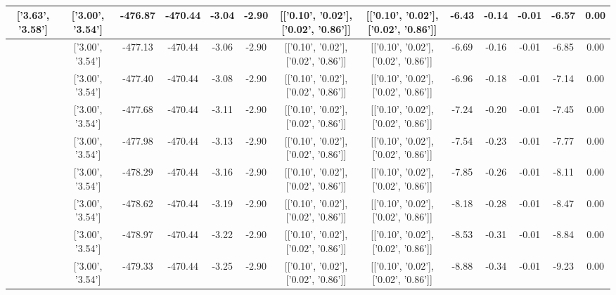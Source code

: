 \begin{table}[htbp]
\begin{adjustbox}{angle=90}
\begin{tabular}{|c|c|c|c|c|c|c|c|c|c|c|c|c|}
 ['3.63', '3.58'] & ['3.00', '3.54'] & -476.87 & -470.44 & -3.04 & -2.90 & [['0.10', '0.02'], ['0.02', '0.86']] & [['0.10', '0.02'], ['0.02', '0.86']] & -6.43 & -0.14 & -0.01 & -6.57 & 0.00\\ \hline
 ['3.67', '3.58'] & ['3.00', '3.54'] & -477.13 & -470.44 & -3.06 & -2.90 & [['0.10', '0.02'], ['0.02', '0.86']] & [['0.10', '0.02'], ['0.02', '0.86']] & -6.69 & -0.16 & -0.01 & -6.85 & 0.00\\ \hline
 ['3.70', '3.59'] & ['3.00', '3.54'] & -477.40 & -470.44 & -3.08 & -2.90 & [['0.10', '0.02'], ['0.02', '0.86']] & [['0.10', '0.02'], ['0.02', '0.86']] & -6.96 & -0.18 & -0.01 & -7.14 & 0.00\\ \hline
 ['3.74', '3.59'] & ['3.00', '3.54'] & -477.68 & -470.44 & -3.11 & -2.90 & [['0.10', '0.02'], ['0.02', '0.86']] & [['0.10', '0.02'], ['0.02', '0.86']] & -7.24 & -0.20 & -0.01 & -7.45 & 0.00\\ \hline
 ['3.78', '3.59'] & ['3.00', '3.54'] & -477.98 & -470.44 & -3.13 & -2.90 & [['0.10', '0.02'], ['0.02', '0.86']] & [['0.10', '0.02'], ['0.02', '0.86']] & -7.54 & -0.23 & -0.01 & -7.77 & 0.00\\ \hline
 ['3.82', '3.59'] & ['3.00', '3.54'] & -478.29 & -470.44 & -3.16 & -2.90 & [['0.10', '0.02'], ['0.02', '0.86']] & [['0.10', '0.02'], ['0.02', '0.86']] & -7.85 & -0.26 & -0.01 & -8.11 & 0.00\\ \hline
 ['3.86', '3.60'] & ['3.00', '3.54'] & -478.62 & -470.44 & -3.19 & -2.90 & [['0.10', '0.02'], ['0.02', '0.86']] & [['0.10', '0.02'], ['0.02', '0.86']] & -8.18 & -0.28 & -0.01 & -8.47 & 0.00\\ \hline
 ['3.89', '3.60'] & ['3.00', '3.54'] & -478.97 & -470.44 & -3.22 & -2.90 & [['0.10', '0.02'], ['0.02', '0.86']] & [['0.10', '0.02'], ['0.02', '0.86']] & -8.53 & -0.31 & -0.01 & -8.84 & 0.00\\ \hline
 ['3.93', '3.60'] & ['3.00', '3.54'] & -479.33 & -470.44 & -3.25 & -2.90 & [['0.10', '0.02'], ['0.02', '0.86']] & [['0.10', '0.02'], ['0.02', '0.86']] & -8.88 & -0.34 & -0.01 & -9.23 & 0.00\\ \hline
            \end{tabular}
        \end{adjustbox}
        \caption{}
        \label{}
    \end{table}
    